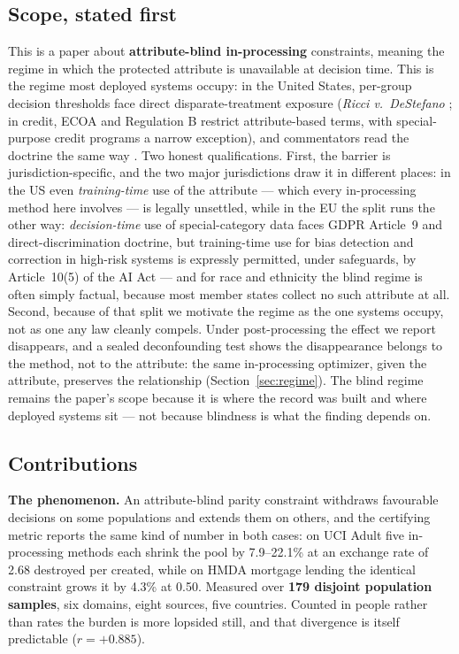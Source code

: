 \documentclass[conference]{IEEEtran}
\begin{document}
\subsection{Scope, stated first}
\label{sec:scope}

This is a paper about \textbf{attribute-blind in-processing} constraints, meaning the regime
in which the protected attribute is unavailable at decision time. This is the regime most
deployed systems occupy: in the United States, per-group decision thresholds face direct
disparate-treatment exposure (\emph{Ricci v.\ DeStefano} \cite{ricci2009}; in credit, ECOA
and Regulation B restrict attribute-based terms, with special-purpose credit programs a narrow exception), and commentators read the
doctrine the same way \cite{barocas2016,corbett2017}. Two honest qualifications. First,
the barrier is jurisdiction-specific, and the two major jurisdictions draw it in different
places: in the US even \emph{training-time} use of the attribute --- which every
in-processing method here involves --- is legally unsettled, while in the EU the split
runs the other way: \emph{decision-time} use of special-category data faces GDPR
Article~9 and direct-discrimination doctrine, but training-time use for bias detection
and correction in high-risk systems is expressly permitted, under safeguards, by
Article~10(5) of the AI Act --- and for race and ethnicity the blind regime is often
simply factual, because most member states collect no such attribute at all. Second,
because of that split we motivate the regime as the one systems occupy, not as one any
law cleanly compels. Under
post-processing the effect we report disappears, and a sealed deconfounding test shows
the disappearance belongs to the method, not to the attribute: the same in-processing
optimizer, given the attribute, preserves the relationship
(Section~\ref{sec:regime}). The blind regime remains the paper's scope because it is
where the record was built and where deployed systems sit --- not because blindness is
what the finding depends on.

\subsection{Contributions}

\textbf{The phenomenon.} An attribute-blind parity constraint withdraws favourable decisions
on some populations and extends them on others, and the certifying metric reports the same
kind of number in both cases: on UCI Adult five in-processing methods each shrink the pool by
7.9--22.1\% at an exchange rate of 2.68 destroyed per created, while on HMDA mortgage lending
the identical constraint grows it by 4.3\% at 0.50. Measured over \textbf{179 disjoint
population samples}, six domains, eight sources, five countries. Counted in people rather than
rates the burden is more lopsided still, and that divergence is itself predictable
($r = +0.885$).
\end{document}
